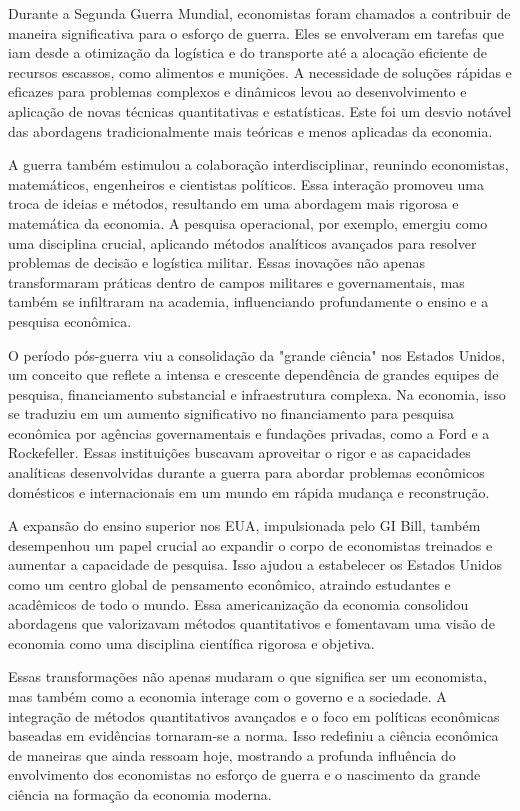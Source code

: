 \documentclass[a4paper,12pt]{article}[abntex2]
\begin{document}
Durante a Segunda Guerra Mundial, economistas foram chamados a contribuir de maneira significativa para o esforço de guerra. Eles se envolveram em tarefas que iam desde a otimização da logística e do transporte até a alocação eficiente de recursos escassos, como alimentos e munições. A necessidade de soluções rápidas e eficazes para problemas complexos e dinâmicos levou ao desenvolvimento e aplicação de novas técnicas quantitativas e estatísticas. Este foi um desvio notável das abordagens tradicionalmente mais teóricas e menos aplicadas da economia.

A guerra também estimulou a colaboração interdisciplinar, reunindo economistas, matemáticos, engenheiros e cientistas políticos. Essa interação promoveu uma troca de ideias e métodos, resultando em uma abordagem mais rigorosa e matemática da economia. A pesquisa operacional, por exemplo, emergiu como uma disciplina crucial, aplicando métodos analíticos avançados para resolver problemas de decisão e logística militar. Essas inovações não apenas transformaram práticas dentro de campos militares e governamentais, mas também se infiltraram na academia, influenciando profundamente o ensino e a pesquisa econômica.

O período pós-guerra viu a consolidação da "grande ciência" nos Estados Unidos, um conceito que reflete a intensa e crescente dependência de grandes equipes de pesquisa, financiamento substancial e infraestrutura complexa. Na economia, isso se traduziu em um aumento significativo no financiamento para pesquisa econômica por agências governamentais e fundações privadas, como a Ford e a Rockefeller. Essas instituições buscavam aproveitar o rigor e as capacidades analíticas desenvolvidas durante a guerra para abordar problemas econômicos domésticos e internacionais em um mundo em rápida mudança e reconstrução.

A expansão do ensino superior nos EUA, impulsionada pelo GI Bill, também desempenhou um papel crucial ao expandir o corpo de economistas treinados e aumentar a capacidade de pesquisa. Isso ajudou a estabelecer os Estados Unidos como um centro global de pensamento econômico, atraindo estudantes e acadêmicos de todo o mundo. Essa americanização da economia consolidou abordagens que valorizavam métodos quantitativos e fomentavam uma visão de economia como uma disciplina científica rigorosa e objetiva.

Essas transformações não apenas mudaram o que significa ser um economista, mas também como a economia interage com o governo e a sociedade. A integração de métodos quantitativos avançados e o foco em políticas econômicas baseadas em evidências tornaram-se a norma. Isso redefiniu a ciência econômica de maneiras que ainda ressoam hoje, mostrando a profunda influência do envolvimento dos economistas no esforço de guerra e o nascimento da grande ciência na formação da economia moderna.
\end{document}
